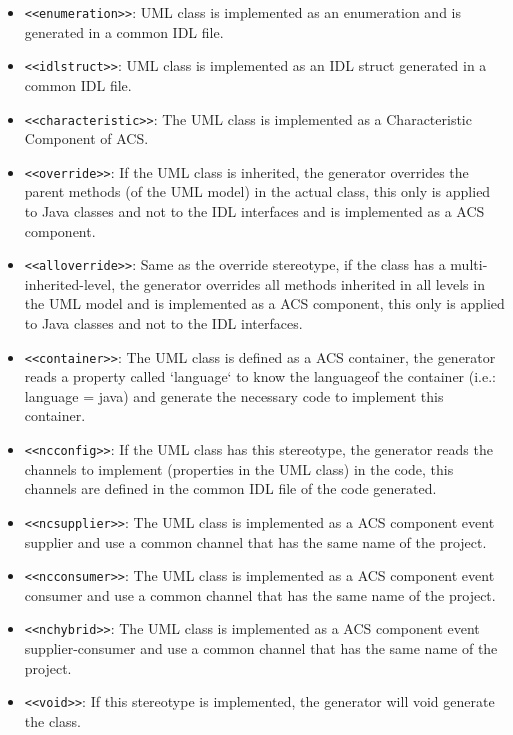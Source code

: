 \begin{itemize}
	\item \verb+<<enumeration>>+: UML class is implemented as an enumeration
	and is generated in a common IDL file.
	\item \verb+<<idlstruct>>+: UML class is implemented as an IDL struct generated
	in a common IDL file.
	\item \verb+<<characteristic>>+: The UML class is implemented as a
	Characteristic Component of ACS.
	\item \verb+<<override>>+: If the UML  class is inherited, the generator
	overrides the parent methods (of the UML model) in the actual class, this only
	is applied to Java classes and not to the IDL interfaces and is implemented
	as a ACS component.
	\item \verb+<<alloverride>>+: Same as the override stereotype, if the class has
	a multi-inherited-level, the generator overrides all methods inherited in all levels in the UML model and is implemented
	as a ACS component, this only is applied to Java classes and not to the IDL interfaces.
	\item \verb+<<container>>+: The UML  class is defined as a ACS container,
	the generator reads a property called `language` to know the languageof the
	container (i.e.: language = java) and generate the necessary code to implement
	this container.
	\item \verb+<<ncconfig>>+: If the UML class has this stereotype, the
	generator reads the channels to implement (properties in the UML class) in the
	code, this channels are defined in the common IDL file of the code generated.
	\item \verb+<<ncsupplier>>+: The UML class is implemented as a ACS component
	event supplier and use a common channel that has the same name of the project.
	\item \verb+<<ncconsumer>>+: The UML class is implemented as a ACS component
	event consumer and use a common channel that has the same name of the project.
	\item \verb+<<nchybrid>>+: The UML class is implemented as a ACS component
	event supplier-consumer and use a common channel that has the same name of the
	project.
	\item \verb+<<void>>+: If this stereotype is implemented, the generator will 
	void generate the class.
\end{itemize}

